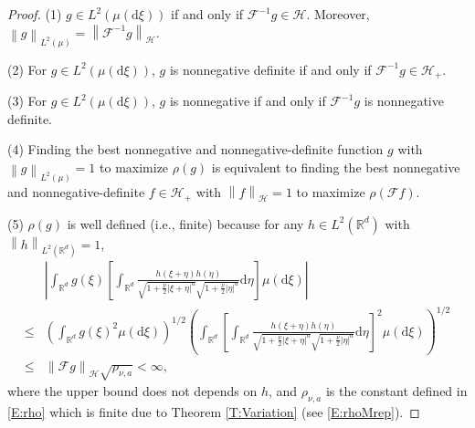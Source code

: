 \documentclass[a4paper,11pt]{article}
\numberwithin{equation}{section}
\numberwithin{equation}{section}
\theoremstyle{plain}
\theoremstyle{definition}
\newcommand{\ud}{\ensuremath{\mathrm{d} }}
\newcommand{\Norm}[1]{\left\|  #1   \right\|}
\newcommand{\R}{\mathbb{R}}
\begin{document}
\begin{proof}
  \noindent (1) $g\in L^2\left(\mu\left(\ud \xi\right)\right)$ if and only if $\mathcal{F}^{-1}g \in
  \mathcal{H}$. Moreover, $\Norm{g}_{L^2(\mu)}=\Norm{\mathcal{F}^{-1}g}_{\mathcal{H}}$.

  \noindent (2) For $g\in L^2\left(\mu\left(\ud \xi\right)\right)$, $g$ is nonnegative definite if
  and only if $\mathcal{F}^{-1}g \in \mathcal{H}_+$.

  \noindent (3) For $g\in L^2\left(\mu\left(\ud \xi\right)\right)$, $g$ is nonnegative if and only
  if $\mathcal{F}^{-1}g$ is nonnegative definite.

  \noindent (4) Finding the best nonnegative and nonnegative-definite function $g$ with
  $\Norm{g}_{L^2(\mu)}=1$ to maximize $\rho(g)$ is equivalent to finding the best
  nonnegative and nonnegative-definite $f\in \mathcal{H}_+$ with $\Norm{f}_{\mathcal{H}}=1$ to
  maximize $\rho\left(\mathcal{F}f\right)$.

  \noindent (5) $\rho(g)$ is well defined (i.e., finite) because for any $h\in
  L^2(\R^d)$ with $\Norm{h}_{L^2(\R^d)}=1$,
  \begin{align*}
    & \left|\int_{\R^d}g(\xi)
    \left[
      \int_{\R^d} \frac{h(\xi + \eta)h(\eta)}{\sqrt{1+\frac{\nu}{2}|\xi+\eta|^a}\sqrt{1+\frac{\nu}{2}|\eta|^a}} \ud \eta
    \right]
    \mu(\ud \xi) \right| \\
    \le & \left(\int_{\R^d}g(\xi)^2 \mu(\ud\xi) \right)^{1/2}
    \left(
      \int_{\R^d}
      \left[
	\int_{\R^d} \frac{h(\xi + \eta)h(\eta)}{\sqrt{1+\frac{\nu}{2}|\xi+\eta|^a}\sqrt{1+\frac{\nu}{2}|\eta|^a}} \ud \eta
      \right]^2
      \mu(\ud \xi)
    \right)^{1/2} \\
    \le & \Norm{\mathcal{F}g}_{\mathcal{H}} \sqrt{\rho_{\nu,a}}<\infty,
  \end{align*}
  where the upper bound does not depends on $h$, and $\rho_{\nu,a}$ is the constant defined in
  \eqref{E:rho} which is finite due to Theorem \ref{T:Variation} (see \eqref{E:rhoMrep}).


\end{proof}
\end{document}
